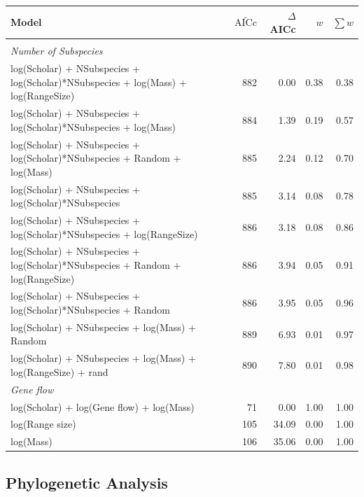 {\begin{landscape}
\begin{table}[t]
\begin{tabular}{@{}>{\footnotesize}lrrrr@{}}
\toprule
\normalsize{Model} & $\bar{\text{AICc}}$ & $\Delta$AICc & $w$ & $\sum w$\\
\midrule
&&&&\\[-3mm]
\textit{\small{Number of Subspecies}} &&&&\\
log(Scholar) + NSubspecies + log(Scholar)*NSubspecies  + log(Mass) + log(RangeSize) & 
882 & 0.00 &
0.38 & 0.38\\
log(Scholar) + NSubspecies + log(Scholar)*NSubspecies  + log(Mass) & 
884 & 1.39 &
0.19 & 0.57\\
log(Scholar) + NSubspecies + log(Scholar)*NSubspecies + Random + log(Mass) & 
885 & 2.24 &
0.12 & 0.70\\
log(Scholar) + NSubspecies + log(Scholar)*NSubspecies  & 
885 & 3.14 &
0.08 & 0.78\\
log(Scholar) + NSubspecies + log(Scholar)*NSubspecies  + log(RangeSize) & 
886 & 3.18 &
0.08 & 0.86\\
log(Scholar) + NSubspecies + log(Scholar)*NSubspecies  + Random + log(RangeSize) & 
886 & 3.94 &
0.05 & 0.91\\
log(Scholar) + NSubspecies + log(Scholar)*NSubspecies  + Random & 
886 & 3.95 &
0.05 & 0.96\\
log(Scholar) + NSubspecies + log(Mass) + Random & 
889 & 6.93 &
0.01 & 0.97\\
log(Scholar) + NSubspecies + log(Mass) + log(RangeSize) + rand& 
890 & 7.80 &
0.01 & 0.98\\[5mm]
\textit{\small{Gene flow}} &&&&\\
log(Scholar) + log(Gene flow) + log(Mass) & 
71 & 0.00 &
1.00 & 1.00\\
log(Range size) & 
105 & 34.09 &
0.00 & 1.00\\
log(Mass) & 
106 & 35.06 &
0.00 & 1.00\\
\bottomrule
\end{tabular}

\label{t:models}
\end{table}
\end{landscape}
}



\subsection{Phylogenetic Analysis}

